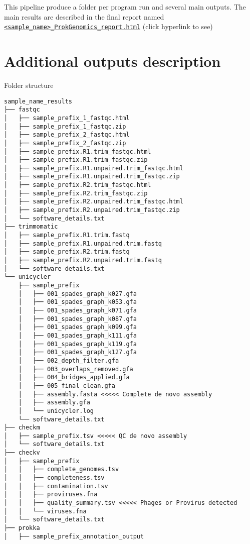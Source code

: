 \documentclass[
]{book}
\begin{document}
This pipeline produce a folder per program run and several main outputs. The main results are described in the final report named \href{https://bioinformatics.erc.monash.edu/home/lper0012/ProkGenomics/1-77321-LFA6246_L2_ProkGenomics_report.html}{\texttt{\textless{}sample\_name\textgreater{}\_ProkGenomics\_report.html}} (click hyperlink to see)

\hypertarget{additional-outputs-description}{%
\section{Additional outputs description}\label{additional-outputs-description}}

Folder structure

\begin{verbatim}
sample_name_results
├── fastqc
│   ├── sample_prefix_1_fastqc.html
│   ├── sample_prefix_1_fastqc.zip
│   ├── sample_prefix_2_fastqc.html
│   ├── sample_prefix_2_fastqc.zip
│   ├── sample_prefix.R1.trim_fastqc.html
│   ├── sample_prefix.R1.trim_fastqc.zip
│   ├── sample_prefix.R1.unpaired.trim_fastqc.html
│   ├── sample_prefix.R1.unpaired.trim_fastqc.zip
│   ├── sample_prefix.R2.trim_fastqc.html
│   ├── sample_prefix.R2.trim_fastqc.zip
│   ├── sample_prefix.R2.unpaired.trim_fastqc.html
│   ├── sample_prefix.R2.unpaired.trim_fastqc.zip
│   └── software_details.txt
├── trimmomatic
│   ├── sample_prefix.R1.trim.fastq
│   ├── sample_prefix.R1.unpaired.trim.fastq
│   ├── sample_prefix.R2.trim.fastq
│   ├── sample_prefix.R2.unpaired.trim.fastq
│   └── software_details.txt
└── unicycler
    ├── sample_prefix
    │   ├── 001_spades_graph_k027.gfa
    │   ├── 001_spades_graph_k053.gfa
    │   ├── 001_spades_graph_k071.gfa
    │   ├── 001_spades_graph_k087.gfa
    │   ├── 001_spades_graph_k099.gfa
    │   ├── 001_spades_graph_k111.gfa
    │   ├── 001_spades_graph_k119.gfa
    │   ├── 001_spades_graph_k127.gfa
    │   ├── 002_depth_filter.gfa
    │   ├── 003_overlaps_removed.gfa
    │   ├── 004_bridges_applied.gfa
    │   ├── 005_final_clean.gfa
    │   ├── assembly.fasta <<<<< Complete de novo assembly
    │   ├── assembly.gfa
    │   └── unicycler.log
    └── software_details.txt
├── checkm
│   ├── sample_prefix.tsv <<<<< QC de novo assembly
│   └── software_details.txt
├── checkv 
│   ├── sample_prefix
│   │   ├── complete_genomes.tsv
│   │   ├── completeness.tsv
│   │   ├── contamination.tsv
│   │   ├── proviruses.fna
│   │   ├── quality_summary.tsv <<<<< Phages or Provirus detected
│   │   └── viruses.fna
│   └── software_details.txt
├── prokka
│   ├── sample_prefix_annotation_output

\end{verbatim}
\end{document}

